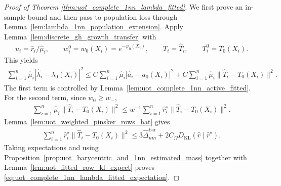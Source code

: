 \documentclass[11pt,reqno]{amsart}
\theoremstyle{definition}
\newcommand{\KL}{\mathrm{KL}}
\renewcommand{\hat}{\widehat}
\begin{document}
\begin{proof}[Proof of Theorem \ref{thm:uot_complete_1nn_lambda_fitted}]
We first prove an in-sample bound and then pass to population loss through Lemma~\ref{lem:lambda_1nn_population_extension}.
Apply Lemma~\ref{lem:discrete_gh_growth_transfer} with
\begin{align*}
    u_i=\hat r_i/\hat\mu_i,
    \qquad
    w_i^0=w_0(X_i)=e^{-\varphi_0(X_i)},
    \qquad
    T_i=\hat T_i,
    \qquad
    T_i^0=T_0(X_i).
\end{align*}
This yields
\begin{align}
\label{eq:lambda_transfer_sum_plan}
    \sum_{i=1}^n\hat\mu_i |\hat\lambda_i-\lambda_0(X_i)|^2
    \le
    C\sum_{i=1}^n\hat\mu_i |\hat a_i-a_0(X_i)|^2
    + C\sum_{i=1}^n\hat\mu_i\|\hat T_i-T_0(X_i)\|^2.
\end{align}
The first term is controlled by Lemma~\ref{lem:uot_complete_1nn_active_fitted}. For the second term, since $w_0\ge w_-$,
\begin{align*}
    \sum_{i=1}^n\hat\mu_i\|\hat T_i-T_0(X_i)\|^2
    \le
    w_-^{-1}
    \sum_{i=1}^n\hat r_i^\star\|\hat T_i-T_0(X_i)\|^2.
\end{align*}
Lemma~\ref{lem:uot_weighted_pinsker_rows_hat} gives
\begin{align*}
    \sum_{i=1}^n\hat r_i^\star\|\hat T_i-T_0(X_i)\|^2
    \le
    3\hat\Delta_{nm}^{\mathrm{bar}}
    +2C_\Omega {D_\KL}(\hat r\mid \hat r^\star).
\end{align*}
Taking expectations and using Proposition~\ref{prop:uot_barycentric_and_1nn_estimated_mass} together with Lemma~\ref{lem:uot_fitted_row_kl_expect} proves \eqref{eq:uot_complete_1nn_lambda_fitted_expectation}.
\end{proof}
\end{document}
